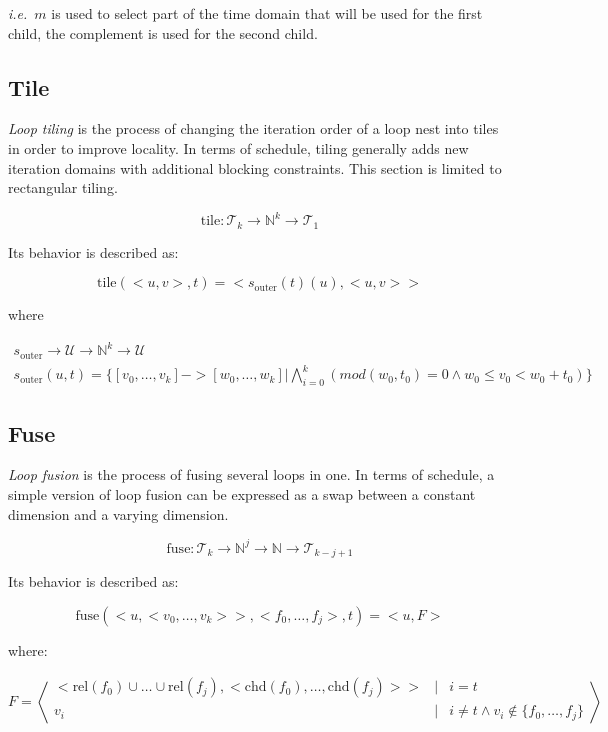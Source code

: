 \documentclass{article}
\begin{document}
\noindent \emph{i.e.}\ $m$ is used to select part of the time domain that will
be used for the first child, the complement is used for the second child.

\subsection{Tile}

\emph{Loop tiling} is the process of changing the iteration order of a loop
nest into tiles in order to improve locality. In terms of schedule, tiling
generally adds new iteration domains with additional blocking constraints. This
section is limited to rectangular tiling.

\[
    \text{tile}: \mathcal{T}_k \rightarrow \mathbb{N}^k \rightarrow \mathcal{T}_1
\]

Its behavior is described as:

\[
    \text{tile}(<u, v>, t) = < s_\text{outer}(t)(u), < u, v > >
\]

\noindent where

\[
    \begin{array}{l}
        s_\text{outer} \rightarrow \mathcal{U} \rightarrow \mathbb{N}^k \rightarrow \mathcal{U} \\
    s_\text{outer}(u, t) = \{ [v_0, \ldots, v_k] -> [w_0, \ldots, w_k] | \bigwedge_{i=0}^k(mod(w_0, t_0) = 0 \wedge w_0 \le v_0 < w_0 + t_0) \}
    \end{array}
\]

\subsection{Fuse}

\emph{Loop fusion} is the process of fusing several loops in one. In terms of
schedule, a simple version of loop fusion can be expressed as a swap between a
constant dimension and a varying dimension.

\[
    \text{fuse}:  \mathcal{T}_k \rightarrow  \mathbb{N}^j \rightarrow \mathbb{N} \rightarrow  \mathcal{T}_{k - j + 1}
\]

Its behavior is described as: 

\[
    \text{fuse}(<u, <v_0, \ldots, v_k> >, <f_0, \ldots, f_j>, t) = < u, F >
\]

\noindent where:

\[
    F = \left<
    \begin{array}{ccl}
         <\text{rel}(f_0) \cup \ldots \cup \text{rel}(f_j), <\text{chd}(f_0), \ldots, \text{chd}(f_j)>  > & |& i = t \\
         v_i & |& i \neq t \wedge  v_i \not\in \{f_0, \ldots, f_j\} \\
    \end{array}
    \right>
\]
\end{document}
